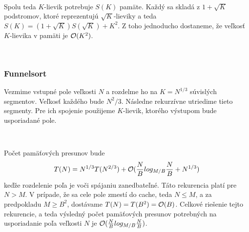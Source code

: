 \documentclass[12pt,a4paper]{article}
\begin{document}
\

Spolu teda $K$-lievik potrebuje $S(K)$ pamäte. Každý sa skladá z $1+\sqrt{K}$ podstromov, ktoré reprezentujú $\sqrt{K}$-lieviky a teda $S(K) = (1+\sqrt{K})S(\sqrt{K}) + K^2$. Z toho jednoducho dostaneme, že veľkosť $K$-lievika v pamäti je $\mathcal{O}(K^2)$.

\


\subsubsection{Funnelsort}

Vezmime vstupné pole veľkosti $N$ a rozdelme ho na $K = N^{1/3}$ súvislých segmentov. Veľkosť každého bude $N^2/3$. Následne rekurzívne utriedime tieto segmenty. Pre ich spojenie použijeme $K$-lievik, ktorého výstupom bude usporiadané pole.

\

Počet pamäťových presunov bude
\[
T(N) = N^{1/3}T(N^{2/3}) + \mathcal{O}(\frac{N}{B} log_{M/B} \frac{N}{B} + N^{1/3})
\]
keďže rozdelenie poľa je voči spájaniu zanedbateľné. Táto rekurencia platí pre $N > M$. V prípade, že sa cele pole zmestí do cache, teda $N \le M$, a za predpokladu $M \ge B^2$, dostávame $T(N) = T(B^2) = \mathcal{O}(B)$. Celkové riešenie tejto rekurencie, a teda výsledný počet pamäťových presunov potrebných na usporiadanie poľa veľkosti $N$ je $\mathcal{O}(\frac{N}{B} log_{M/B} \frac{N}{B})$.
%
%
%

\nocite{*}


\end{document}
